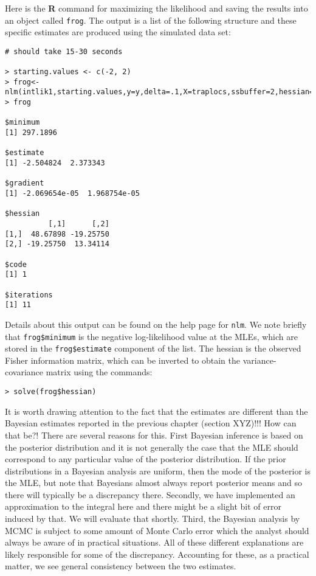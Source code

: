 Here is the {\bf R} command for maximizing the likelihood and saving the
results into an object called \mbox{\tt frog}.  The output is a list of the
following structure and these specific estimates are produced using
the simulated data set:

{\small 
\begin{verbatim}
# should take 15-30 seconds

> starting.values <- c(-2, 2) 
> frog<-nlm(intlik1,starting.values,y=y,delta=.1,X=traplocs,ssbuffer=2,hessian=TRUE)
> frog

$minimum
[1] 297.1896

$estimate
[1] -2.504824  2.373343

$gradient
[1] -2.069654e-05  1.968754e-05

$hessian
          [,1]      [,2]
[1,]  48.67898 -19.25750
[2,] -19.25750  13.34114

$code
[1] 1

$iterations
[1] 11
\end{verbatim}
} 
Details about this output can be found on the help page for
\mbox{\tt nlm}. We note briefly that \mbox{\tt frog\$minimum} is the
negative log-likelihood value at the MLEs, which are stored in the
\mbox{\tt frog\$estimate} component of the list. The hessian is the
observed Fisher information matrix, which can be inverted to obtain
the variance-covariance matrix using the commands:
\begin{verbatim}
> solve(frog$hessian)
\end{verbatim}

It is worth drawing attention to the fact that the estimates are
different than the Bayesian estimates reported in the previous chapter
(section XYZ)!!! How can that be?!  There are several reasons for
this.  First Bayesian inference is based on the posterior distribution
and it is not generally the case that the MLE should correspond to any
particular value of the posterior distribution. If the prior
distributions in a Bayesian analysis are uniform, then the mode of the
posterior is the MLE, but note that Bayesians almost always report
posterior means and so there will typically be a discrepancy
there. Secondly, we have implemented an approximation to the integral
here and there might be a slight bit of error induced by that. We will
evaluate that shortly. Third, the Bayesian analysis by MCMC is subject
to some amount of Monte Carlo error which the analyst should always be
aware of in practical situations.  All of these different explanations
are likely responsible for some of the discrepancy. Accounting for
these, as a practical matter, we see general consistency between the
two estimates.


